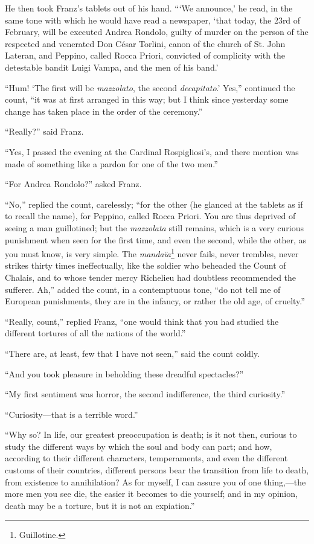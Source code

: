 He then took Franz’s tablets out of his hand. “‘We announce,’ he read,
in the same tone with which he would have read a newspaper, ‘that
today, the 23rd of February, will be executed Andrea Rondolo, guilty of
murder on the person of the respected and venerated Don César Torlini,
canon of the church of St. John Lateran, and Peppino, called Rocca
Priori, convicted of complicity with the detestable bandit Luigi Vampa,
and the men of his band.’

“Hum! ‘The first will be \textit{mazzolato}, the second \textit{decapitato}.’ Yes,”
continued the count, “it was at first arranged in this way; but I think
since yesterday some change has taken place in the order of the
ceremony.”

“Really?” said Franz.

“Yes, I passed the evening at the Cardinal Rospigliosi’s, and there
mention was made of something like a pardon for one of the two men.”

“For Andrea Rondolo?” asked Franz.

“No,” replied the count, carelessly; “for the other (he glanced at the
tablets as if to recall the name), for Peppino, called Rocca Priori.
You are thus deprived of seeing a man guillotined; but the \textit{mazzolata}
still remains, which is a very curious punishment when seen for the
first time, and even the second, while the other, as you must know, is
very simple. The \textit{mandaïa}\footnote[6]{Guillotine.} never fails, never trembles, never strikes
thirty times ineffectually, like the soldier who beheaded the Count of
Chalais, and to whose tender mercy Richelieu had doubtless recommended
the sufferer. Ah,” added the count, in a contemptuous tone, “do not
tell me of European punishments, they are in the infancy, or rather the
old age, of cruelty.”

“Really, count,” replied Franz, “one would think that you had studied
the different tortures of all the nations of the world.”

“There are, at least, few that I have not seen,” said the count coldly.

“And you took pleasure in beholding these dreadful spectacles?”

“My first sentiment was horror, the second indifference, the third
curiosity.”

“Curiosity—that is a terrible word.”

“Why so? In life, our greatest preoccupation is death; is it not then,
curious to study the different ways by which the soul and body can
part; and how, according to their different characters, temperaments,
and even the different customs of their countries, different persons
bear the transition from life to death, from existence to annihilation?
As for myself, I can assure you of one thing,—the more men you see die,
the easier it becomes to die yourself; and in my opinion, death may be
a torture, but it is not an expiation.”

